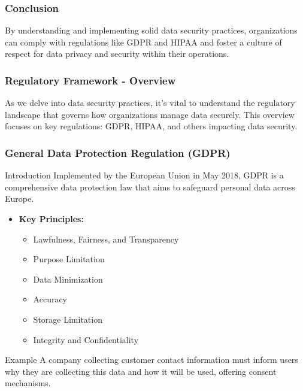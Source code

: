 \documentclass{beamer}
\begin{document}
\begin{frame}[fragile]
    \frametitle{Conclusion}
    By understanding and implementing solid data security practices, organizations can comply with regulations like GDPR and HIPAA and foster a culture of respect for data privacy and security within their operations.
\end{frame}

\begin{frame}[fragile]
    \frametitle{Regulatory Framework - Overview}
    As we delve into data security practices, it's vital to understand the regulatory landscape that governs how organizations manage data securely. This overview focuses on key regulations: GDPR, HIPAA, and others impacting data security.
\end{frame}

\begin{frame}[fragile]
    \frametitle{General Data Protection Regulation (GDPR)}
    
    \begin{block}{Introduction}
        Implemented by the European Union in May 2018, GDPR is a comprehensive data protection law that aims to safeguard personal data across Europe.
    \end{block}

    \begin{itemize}
        \item \textbf{Key Principles:}
        \begin{itemize}
            \item Lawfulness, Fairness, and Transparency
            \item Purpose Limitation
            \item Data Minimization
            \item Accuracy
            \item Storage Limitation
            \item Integrity and Confidentiality
        \end{itemize}
    \end{itemize}
    
    \begin{block}{Example}
        A company collecting customer contact information must inform users why they are collecting this data and how it will be used, offering consent mechanisms.
    \end{block}
\end{frame}
\end{document}

